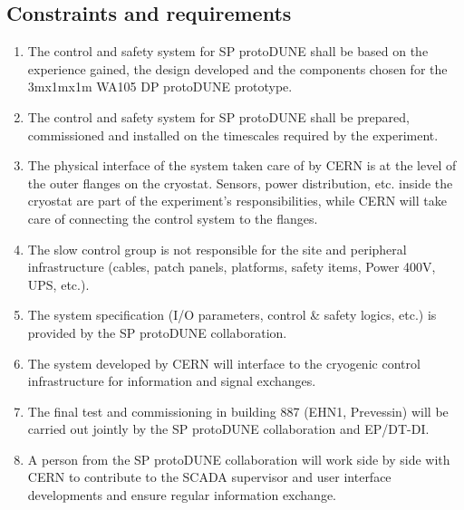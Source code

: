 \subsection{Constraints and requirements}
\begin{enumerate}
\item	The control and safety system for SP protoDUNE shall be based on the experience gained, the design developed and the 
components chosen for the 3mx1mx1m WA105 DP protoDUNE prototype.
\item	The control and safety system for SP protoDUNE shall be prepared, commissioned and installed on the timescales 
required by the experiment.

\item	The physical interface of the system taken care of by CERN is at the level of the outer flanges on the cryostat. 
Sensors, power distribution, etc. inside the cryostat are part of the experiment's responsibilities, while CERN will take 
care of connecting the control system to the flanges.
\item	The slow control group is not responsible for the site and peripheral infrastructure (cables, patch panels, 
platforms, safety items, Power 400V, UPS, etc.).
\item	The system specification (I/O parameters, control \& safety logics, etc.) is provided by the SP protoDUNE 
collaboration.
\item	The system developed by CERN will interface to the cryogenic control infrastructure for information and signal 
exchanges. 
\item	The final test and commissioning in building 887 (EHN1, Prevessin) will be carried out jointly by the SP protoDUNE 
collaboration and EP/DT-DI.
\item	A person from the SP protoDUNE collaboration will work side by side with CERN to contribute to the SCADA 
supervisor and user interface developments and ensure regular information exchange.


\end{enumerate}
